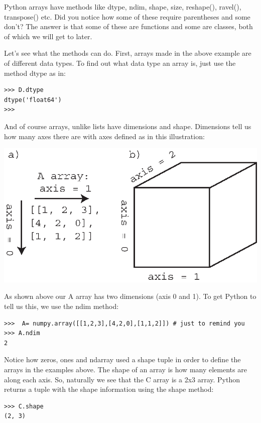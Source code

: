\documentclass[11pt]{book}
\begin{document}
{{Python arrays have methods like {\color{blue}dtype},  {\color{blue}ndim}, {\color{blue}shape}, {\color{blue}size}, {\color{blue}reshape()}, {\color{blue}ravel()},  {\color{blue}transpose()} etc.    Did you notice how some of these require parentheses and some don't? The answer is that some of these are functions and some are classes, both of which we will get to later.

Let's see what the methods can do.
First,  arrays made in the above example are of different data types. To find out what data type an array is, just use the method {\color{blue}dtype} as in:

{ \color{blue} \begin{verbatim}
>>> D.dtype
dtype('float64')
>>>
\end{verbatim}}



 And of course  arrays, unlike lists have dimensions and shape.  Dimensions tell us how many axes there are with axes defined as in this illustration:

   \includegraphics[width=15cm]{EPSfiles/ndim.eps}

   As shown above our {\color{blue}A} array has two dimensions (axis 0 and 1).  To get Python to tell us this, we use the {\color{blue}ndim} method:

   { \color{blue} \begin{verbatim}
>>>  A= numpy.array([[1,2,3],[4,2,0],[1,1,2]]) # just to remind you
>>> A.ndim
2
\end{verbatim}}
Notice how {\color{blue}zeros, ones} and {\color{blue}ndarray} used a shape tuple in order to define the arrays in the examples above.   The shape of an array is how many elements are along each axis.  So, naturally we see that the C array is a 2x3 array.  Python returns a tuple with the shape information using the {\color{blue}shape} method:
{ \color{blue} \begin{verbatim}
>>> C.shape
(2, 3)
\end{verbatim}}

}}
\end{document}
